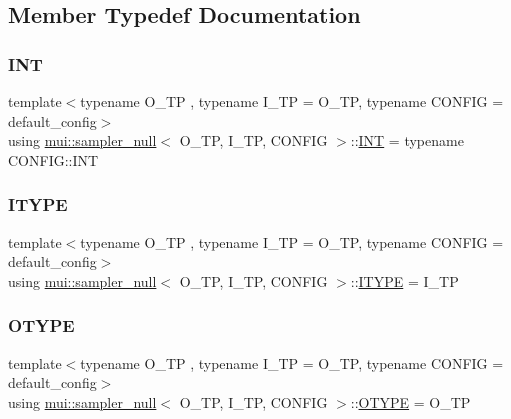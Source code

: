 \subsection{Member Typedef Documentation}
\mbox{\label{classmui_1_1sampler__null_a2eb2c471860904568cbc260b4402eb73}} 
\subsubsection{\texorpdfstring{I\+NT}{INT}}
{\footnotesize\ttfamily template$<$typename O\+\_\+\+TP , typename I\+\_\+\+TP  = O\+\_\+\+TP, typename C\+O\+N\+F\+IG  = default\+\_\+config$>$ \\
using \hyperlink{classmui_1_1sampler__null}{mui\+::sampler\+\_\+null}$<$ O\+\_\+\+TP, I\+\_\+\+TP, C\+O\+N\+F\+IG $>$\+::\hyperlink{classmui_1_1sampler__null_a2eb2c471860904568cbc260b4402eb73}{I\+NT} =  typename C\+O\+N\+F\+I\+G\+::\+I\+NT}

\mbox{\label{classmui_1_1sampler__null_a000a82d8a158f0188279e708c2625865}} 
\subsubsection{\texorpdfstring{I\+T\+Y\+PE}{ITYPE}}
{\footnotesize\ttfamily template$<$typename O\+\_\+\+TP , typename I\+\_\+\+TP  = O\+\_\+\+TP, typename C\+O\+N\+F\+IG  = default\+\_\+config$>$ \\
using \hyperlink{classmui_1_1sampler__null}{mui\+::sampler\+\_\+null}$<$ O\+\_\+\+TP, I\+\_\+\+TP, C\+O\+N\+F\+IG $>$\+::\hyperlink{classmui_1_1sampler__null_a000a82d8a158f0188279e708c2625865}{I\+T\+Y\+PE} =  I\+\_\+\+TP}

\mbox{\label{classmui_1_1sampler__null_a6f20339fd4ce5f99e6800ab77558f9e9}} 
\subsubsection{\texorpdfstring{O\+T\+Y\+PE}{OTYPE}}
{\footnotesize\ttfamily template$<$typename O\+\_\+\+TP , typename I\+\_\+\+TP  = O\+\_\+\+TP, typename C\+O\+N\+F\+IG  = default\+\_\+config$>$ \\
using \hyperlink{classmui_1_1sampler__null}{mui\+::sampler\+\_\+null}$<$ O\+\_\+\+TP, I\+\_\+\+TP, C\+O\+N\+F\+IG $>$\+::\hyperlink{classmui_1_1sampler__null_a6f20339fd4ce5f99e6800ab77558f9e9}{O\+T\+Y\+PE} =  O\+\_\+\+TP}


